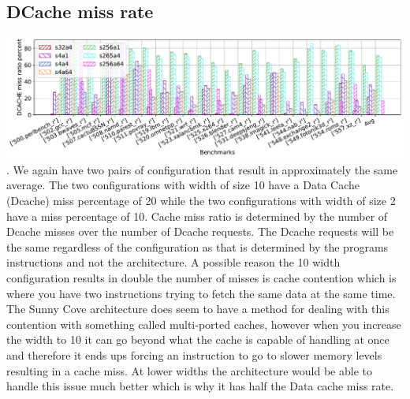 \documentclass{article}
\begin{document}
\subsection*{DCache miss rate}
\includegraphics[width=\textwidth]{DCACHE.pdf}.
We again have two pairs of configuration that result in approximately the same average. The two configurations with width of size 10 have a Data Cache (Dcache) miss percentage of 20 while the two configurations with width of size 2 have a miss percentage of 10. Cache miss ratio is determined by the number of Dcache misses over the number of Dcache requests. The Dcache requests will be the same regardless of the configuration as that is determined by the programs instructions and not the architecture. A possible reason the 10 width configuration results in double the number of misses is cache contention which is where you have two instructions trying to fetch the same data at the same time. The Sunny Cove architecture does seem to have a method for dealing with this contention with something called multi-ported caches, however when you increase the width to 10 it can go beyond what the cache is capable of handling at once and therefore it ends ups forcing an instruction to go to slower memory levels resulting in a cache miss. At lower widths the architecture would be able to handle this issue much better which is why it has half the Data cache miss rate. 
\end{document}
